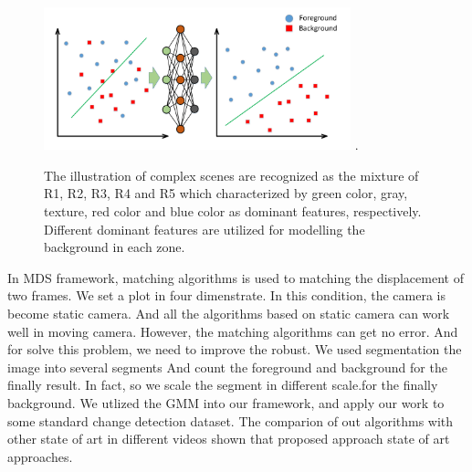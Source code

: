 \documentclass[journal]{IEEEtran}
\begin{document}
\begin{figure}[!t]	%
\centering
\includegraphics[width=3.5in]{figure/fig1}
\DeclareGraphicsExtensions.
\vspace{-10pt}
\caption{The illustration of complex scenes are recognized as the
mixture of R1, R2, R3, R4 and R5 which characterized by green color,
gray, texture, red color and blue color as dominant features,
respectively. Different dominant features are utilized for modelling
the background in each zone.}
\label{fig1}		%
\end{figure}
\indent In MDS framework, matching algorithms is used to matching the displacement
of two frames. We set a plot in four dimenstrate. In this condition, the camera
is become static camera. And all the algorithms based on static camera can
work well in moving camera. However, the matching algorithms can get no error.
And for solve this problem, we need to improve the robust. We used segmentation
the image into several segments And count the foreground and background for
the finally result. In fact, so we scale the segment in different scale.for 
the finally background. We utlized the GMM into our framework, and apply our 
work to some standard change detection dataset. The comparion of out algorithms
with other state of art in different videos shown that proposed approach state
of art approaches.
\end{document}
